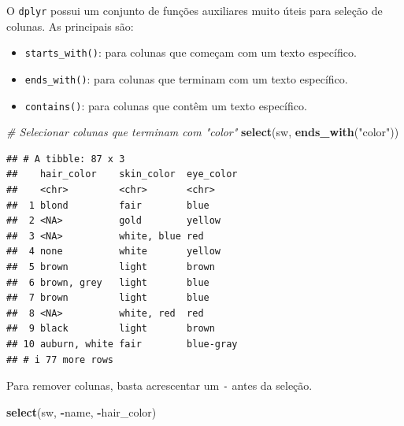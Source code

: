\documentclass[
]{book}
\newenvironment{Shaded}{\begin{snugshade}}{\end{snugshade}}
\newcommand{\CommentTok}[1]{\textcolor[rgb]{0.56,0.35,0.01}{\textit{#1}}}
\newcommand{\FunctionTok}[1]{\textcolor[rgb]{0.13,0.29,0.53}{\textbf{#1}}}
\newcommand{\NormalTok}[1]{#1}
\newcommand{\SpecialCharTok}[1]{\textcolor[rgb]{0.81,0.36,0.00}{\textbf{#1}}}
\newcommand{\StringTok}[1]{\textcolor[rgb]{0.31,0.60,0.02}{#1}}
\providecommand{\tightlist}{%
  \setlength{\itemsep}{0pt}\setlength{\parskip}{0pt}}
\begin{document}
O \texttt{dplyr} possui um conjunto de funções auxiliares muito úteis para
seleção de colunas. As principais são:

\begin{itemize}
\tightlist
\item
  \texttt{starts\_with()}: para colunas que começam com um texto específico.
\item
  \texttt{ends\_with()}: para colunas que terminam com um texto específico.
\item
  \texttt{contains()}: para colunas que contêm um texto específico.
\end{itemize}

\begin{Shaded}
\begin{Highlighting}[]
\CommentTok{\# Selecionar colunas que terminam com "color"}
\FunctionTok{select}\NormalTok{(sw, }\FunctionTok{ends\_with}\NormalTok{(}\StringTok{"color"}\NormalTok{))}
\end{Highlighting}
\end{Shaded}

\begin{verbatim}
## # A tibble: 87 x 3
##    hair_color    skin_color  eye_color
##    <chr>         <chr>       <chr>    
##  1 blond         fair        blue     
##  2 <NA>          gold        yellow   
##  3 <NA>          white, blue red      
##  4 none          white       yellow   
##  5 brown         light       brown    
##  6 brown, grey   light       blue     
##  7 brown         light       blue     
##  8 <NA>          white, red  red      
##  9 black         light       brown    
## 10 auburn, white fair        blue-gray
## # i 77 more rows
\end{verbatim}

Para remover colunas, basta acrescentar um \texttt{-} antes da seleção.

\begin{Shaded}
\begin{Highlighting}[]
\FunctionTok{select}\NormalTok{(sw, }\SpecialCharTok{{-}}\NormalTok{name, }\SpecialCharTok{{-}}\NormalTok{hair\_color)}
\end{Highlighting}
\end{Shaded}
\end{document}
